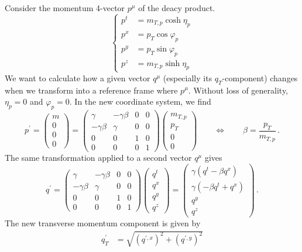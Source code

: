 Consider the momentum 4-vector $p^\mu$ of the deacy product.
\begin{equation*}
    \left\{
    \begin{split}
        p^t&=m_{T,p}\cosh\eta_p\\
        p^x&=p_T\cos\varphi_p\\
        p^y&=p_T\sin\varphi_p\\
        p^z&=m_{T,p}\sinh\eta_p
    \end{split}
    \right.
\end{equation*}
We want to calculate how a given vector $q^\mu$ (especially its $q_T$-component) changes when we transform into a reference frame where $p^\mu$. Without loss of generality, ${\eta_p=0}$ and ${\varphi_p=0}$. In the new coordinate system, we find
\begin{equation}
    p^\prime=\begin{pmatrix}
        m\\0\\0\\0
    \end{pmatrix}=
    \begin{pmatrix}
        \gamma&-\gamma\beta&0&0\\
        -\gamma\beta&\gamma&0&0\\
        0&0&1&0\\
        0&0&0&1
    \end{pmatrix}
    \begin{pmatrix}
        m_{T,p}\\p_{T}\\0\\0
    \end{pmatrix}
    \qquad\iff\qquad
    \beta=\frac{p_T}{m_{T,p}}\,.
\end{equation}
The same transformation applied to a second vector $q^\mu$ gives
\begin{equation}
    q^\prime=
    \begin{pmatrix}
        \gamma&-\gamma\beta&0&0\\
        -\gamma\beta&\gamma&0&0\\
        0&0&1&0\\
        0&0&0&1
    \end{pmatrix}
    \begin{pmatrix}
        q^t\\q^x\\q^y\\q^z
    \end{pmatrix}
    =\begin{pmatrix}
        \gamma(q^t-\beta q^x)\\\gamma(-\beta q^t+q^x)\\q^y\\q^z
    \end{pmatrix}\,.
\end{equation}
The new transverse momentum component is given by
\begin{align}
    q^\prime_T&=\sqrt{(q^{\prime,x})^2+(q^{\prime,y})^2}
\end{align}